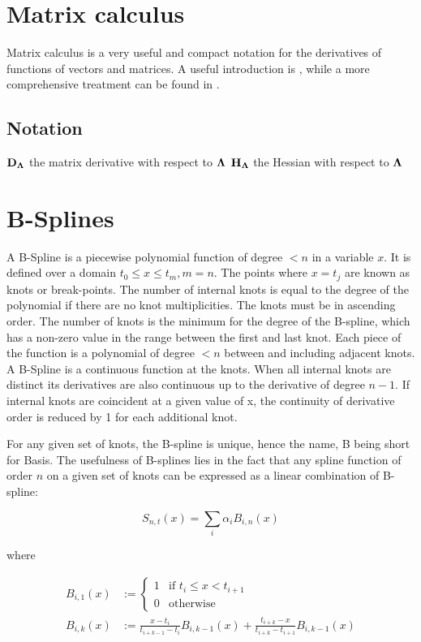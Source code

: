 \documentclass{article}[12pt]
\begin{document}
\section{Matrix calculus}

Matrix calculus is a very useful and compact notation for the derivatives of functions of vectors and matrices.
A useful introduction is \cite{wand02}, while a more comprehensive treatment can be found in
\cite{MagnusNeudecker99}.

\subsection{Notation}

${\bf D}_{\boldsymbol \Lambda}$ the matrix derivative with respect to ${\boldsymbol \Lambda}$
${\bf H}_{\boldsymbol \Lambda}$ the Hessian with respect to ${\boldsymbol \Lambda}$

\section{B-Splines}

A B-Spline is a piecewise polynomial function of degree $< n$ in a variable $x$. It is defined over a
domain $t_0 \leq x \leq t_m, m=n$. The points where $x = t_j$ are known as knots or break-points. The
number of internal knots is equal to the degree of the polynomial if there are no knot multiplicities.
The knots must be in ascending order. The number of knots is the minimum for the degree of the B-spline,
which has a non-zero value in the range between the first and last knot. Each piece of the function is a
polynomial of degree $< n$ between and including adjacent knots. A B-Spline is a continuous function at the
knots. When all internal knots are distinct its derivatives are also continuous up to the derivative of degree
$n - 1$. If internal knots are coincident at a given value of x, the continuity of derivative order is reduced
by 1 for each additional knot.

For any given set of knots, the B-spline is unique, hence the name, B being short for Basis. The usefulness
of B-splines lies in the fact that any spline function of order $n$ on a given set of knots can be expressed
as a linear combination of B-spline:

$$
S_{n, t}(x) = \sum_i \alpha_i B_{i, n}(x)
$$

where

\begin{align*}
B_{i, 1}(x) &:= \begin{cases}
1 & \text{if } t_i \leq x < t_{i+1} \\
0 & \text{otherwise}
\end{cases} \\
B_{i, k}(x) &:= \frac{x - t_i}{t_{i + k - 1} - t_i} B_{i, k-1} (x) + \frac{t_{i + k} - x}{t_{i + k} - t_{i + 1}} B_{i, k-1} (x)
\end{align*}




\end{document}
